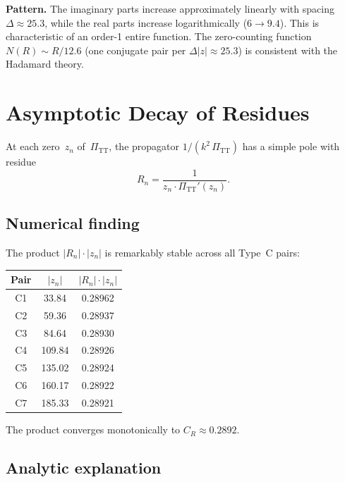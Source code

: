 \documentclass[11pt,a4paper]{article}
\newcommand{\PiTT}{\Pi_{\mathrm{TT}}}
\begin{document}
\noindent
\textbf{Pattern.}  The imaginary parts increase approximately linearly
with spacing $\Delta \approx 25.3$, while the real parts increase
logarithmically ($6 \to 9.4$).  This is characteristic of an order-1
entire function.  The zero-counting function
$N(R) \sim R/12.6$ (one conjugate pair per $\Delta|z| \approx 25.3$)
is consistent with the Hadamard theory.


\section{Asymptotic Decay of Residues}
\label{sec:asymptotic}

At each zero~$z_n$ of~$\PiTT$, the propagator $1/(k^2\,\PiTT)$ has a
simple pole with residue
\begin{equation}\label{eq:residue}
  R_n = \frac{1}{z_n \cdot \PiTT'(z_n)}.
\end{equation}

\subsection{Numerical finding}

The product $|R_n| \cdot |z_n|$ is remarkably stable across all Type~C
pairs:

\begin{center}
\begin{tabular}{ccc}
\toprule
Pair & $|z_n|$ & $|R_n| \cdot |z_n|$ \\
\midrule
C1 & 33.84 & 0.28962 \\
C2 & 59.36 & 0.28937 \\
C3 & 84.64 & 0.28930 \\
C4 & 109.84 & 0.28926 \\
C5 & 135.02 & 0.28924 \\
C6 & 160.17 & 0.28922 \\
C7 & 185.33 & 0.28921 \\
\bottomrule
\end{tabular}
\end{center}

The product converges monotonically to $C_R \approx 0.2892$.

\subsection{Analytic explanation}
\end{document}
